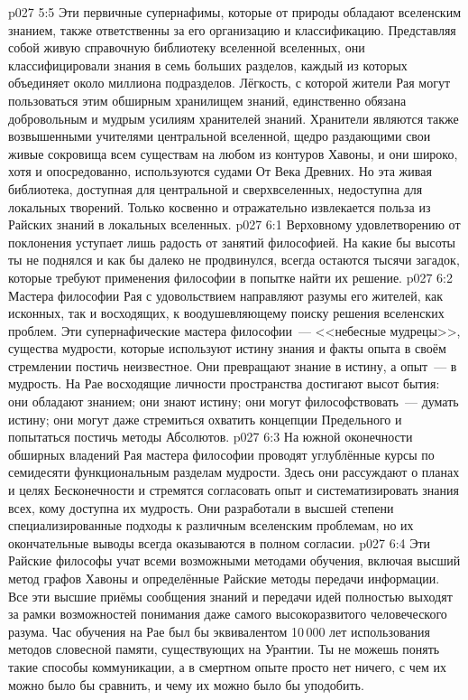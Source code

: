 \vs p027 5:5 Эти первичные супернафимы, которые от природы обладают вселенским знанием, также ответственны за его организацию и классификацию. Представляя собой живую справочную библиотеку вселенной вселенных, они классифицировали знания в семь больших разделов, каждый из которых объединяет около миллиона подразделов. Лёгкость, с которой жители Рая могут пользоваться этим обширным хранилищем знаний, единственно обязана добровольным и мудрым усилиям хранителей знаний. Хранители являются также возвышенными учителями центральной вселенной, щедро раздающими свои живые сокровища всем существам на любом из контуров Хавоны, и они широко, хотя и опосредованно, используются судами От Века Древних. Но эта живая библиотека, доступная для центральной и сверхвселенных, недоступна для локальных творений. Только косвенно и отражательно извлекается польза из Райских знаний в локальных вселенных.
\vs p027 6:1 Верховному удовлетворению от поклонения уступает лишь радость от занятий философией. На какие бы высоты ты не поднялся и как бы далеко не продвинулся, всегда остаются тысячи загадок, которые требуют применения философии в попытке найти их решение.
\vs p027 6:2 Мастера философии Рая с удовольствием направляют разумы его жителей, как исконных, так и восходящих, к воодушевляющему поиску решения вселенских проблем. Эти супернафические мастера философии~--- <<небесные мудрецы>>, существа мудрости, которые используют истину знания и факты опыта в своём стремлении постичь неизвестное. Они превращают знание в истину, а опыт~--- в мудрость. На Рае восходящие личности пространства достигают высот бытия: они обладают знанием; они знают истину; они могут философствовать~--- думать истину; они могут даже стремиться охватить концепции Предельного и попытаться постичь методы Абсолютов.
\vs p027 6:3 На южной оконечности обширных владений Рая мастера философии проводят углублённые курсы по семидесяти функциональным разделам мудрости. Здесь они рассуждают о планах и целях Бесконечности и стремятся согласовать опыт и систематизировать знания всех, кому доступна их мудрость. Они разработали в высшей степени специализированные подходы к различным вселенским проблемам, но их окончательные выводы всегда оказываются в полном согласии.
\vs p027 6:4 Эти Райские философы учат всеми возможными методами обучения, включая высший метод графов Хавоны и определённые Райские методы передачи информации. Все эти высшие приёмы сообщения знаний и передачи идей полностью выходят за рамки возможностей понимания даже самого высокоразвитого человеческого разума. Час обучения на Рае был бы эквивалентом 10\,000 лет использования методов словесной памяти, существующих на Урантии. Ты не можешь понять такие способы коммуникации, а в смертном опыте просто нет ничего, с чем их можно было бы сравнить, и чему их можно было бы уподобить.

